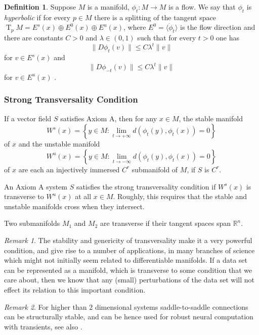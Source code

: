 \documentclass{article}
\theoremstyle{definition}
\newtheorem{definition}{Definition}
\theoremstyle{remark}
\newtheorem{remark}{Remark}
\newcommand{\T}{\operatorname{T}}
\newcommand{\TpM}{\T_p\!M}
\newcounter{ct}
\begin{document}
\begin{definition}
 Suppose $M$ is a manifold, $\phi_t\colon M\rightarrow M$ is a flow.
  We say that $\phi_t$ is \emph{hyperbolic} %
   if for every $p\in M$ there is a splitting of the tangent space $\TpM=E^s(x)\oplus E^0(x)\oplus E^u(x)$, where $E^0=\langle \dot\phi_t\rangle$ is the flow direction and there are constants $C>0$ and $\lambda\in(0,1)$ such that for every $t>0$ one has \[\|D\phi_t(v)\|\leq C\lambda^t\|v\|\]
for $v\in E^s(x)$ and \[\|D\phi_{-t}(v)\|\leq C\lambda^t\|v\|\] for $v\in E^u(x)$ . 
\end{definition}

\subsubsection{Strong Transversality Condition}

If a vector field $S$ satisfies Axiom A, then for any $x \in M$, the stable manifold 
\[W^s(x)=\left\{ y \in M \colon \lim_{t\rightarrow+\infty} d(\phi_t( y), \phi_t(x))=0\right\}\]
of $x$ and the unstable manifold
\[W^u(x)=\left\{ y \in M \colon \lim_{t\rightarrow-\infty} d(\phi_t( y), \phi_t(x))=0\right\}\]
of $x$ are each an injectively immersed $C^r$ submanifold of $M$, if $S$ is $C^r$.

An Axiom A system $S$ satisfies the strong transversality condition if $W^s(x)$ is transverse to $W^u(x)$ at all $x\in M$.
Roughly, this requires that the stable and unstable manifolds cross when they intersect. 

Two submanifolds $M_1$ and $M_2$ are transverse if their tangent spaces span $\mathbb{R}^n$.

\begin{remark}
The stability and genericity of transversality make it a very powerful condition, and give rise to a number of applications, in many branches of science which might not initially seem related to
differentiable manifolds. If a data set can be represented as a manifold, which is transverse to some condition that we care about, then we know that any (small) perturbations of the data set will not effect its relation to this important condition.
\end{remark}


\begin{remark}
For higher than 2 dimensional systems saddle-to-saddle connections can be structurally stable, and can be hence used for robust neural computation with transients, see also \cite{rabinovich2008}.
\end{remark}
\end{document}

